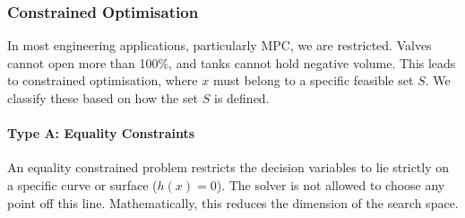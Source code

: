 \subsubsection{Constrained Optimisation}

In most engineering applications, particularly MPC, we are restricted. Valves cannot open more than 100\%, and tanks cannot hold negative volume. This leads to constrained optimisation, where $x$ must belong to a specific feasible set $S$. We classify these based on how the set $S$ is defined.

\paragraph{Type A: Equality Constraints}

An equality constrained problem restricts the decision variables to lie strictly on a specific curve or surface ($h(x)=0$). The solver is not allowed to choose any point off this line. Mathematically, this reduces the dimension of the search space.

